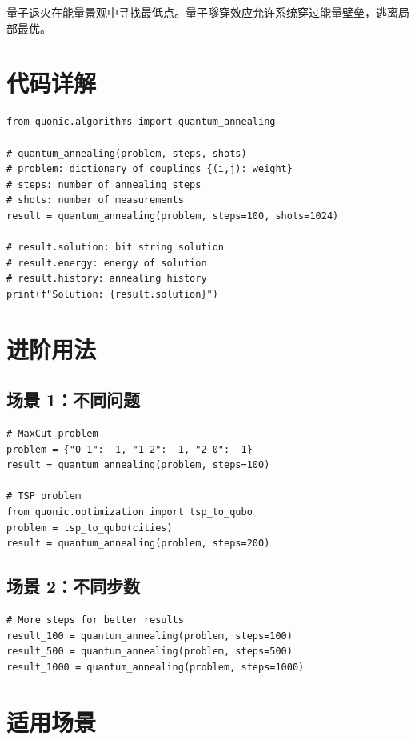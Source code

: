 \documentclass[12pt,a4paper]{article}
\begin{document}
量子退火在能量景观中寻找最低点。量子隧穿效应允许系统穿过能量壁垒，逃离局部最优。

\section{代码详解}

\begin{lstlisting}[style=python]
from quonic.algorithms import quantum_annealing

# quantum_annealing(problem, steps, shots)
# problem: dictionary of couplings {(i,j): weight}
# steps: number of annealing steps
# shots: number of measurements
result = quantum_annealing(problem, steps=100, shots=1024)

# result.solution: bit string solution
# result.energy: energy of solution
# result.history: annealing history
print(f"Solution: {result.solution}")
\end{lstlisting}

\section{进阶用法}

\subsection{场景 1：不同问题}

\begin{lstlisting}[style=python]
# MaxCut problem
problem = {"0-1": -1, "1-2": -1, "2-0": -1}
result = quantum_annealing(problem, steps=100)

# TSP problem
from quonic.optimization import tsp_to_qubo
problem = tsp_to_qubo(cities)
result = quantum_annealing(problem, steps=200)
\end{lstlisting}

\subsection{场景 2：不同步数}

\begin{lstlisting}[style=python]
# More steps for better results
result_100 = quantum_annealing(problem, steps=100)
result_500 = quantum_annealing(problem, steps=500)
result_1000 = quantum_annealing(problem, steps=1000)
\end{lstlisting}

\section{适用场景}
\end{document}
